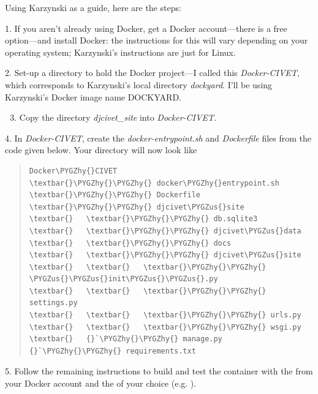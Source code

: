 \documentclass[letterpaper,10pt,english]{sphinxmanual}
\def\PYGZus{\char`\_}
\def\PYGZhy{\char`\-}
\begin{document}
Using Karzynski as a guide, here are the steps:

1. If you aren't already using Docker, get a Docker account—there is a free option—and install Docker: the instructions for
this will vary depending on your operating system; Karzynski's instructions are just for Linux.

2. Set-up a directory to hold the Docker project---I called this \emph{Docker-CIVET}, which corresponds to Karzynski's local
directory \emph{dockyard}. I'll be using Karzynski's Docker image name DOCKYARD.
\begin{enumerate}
\setcounter{enumi}{2}
\item {} 
Copy the directory \emph{djcivet\_site} into \emph{Docker-CIVET}.

\end{enumerate}

4. In \emph{Docker-CIVET}, create the \emph{docker-entrypoint.sh} and \emph{Dockerfile} files from the code given below. Your directory
will now look like
\begin{quote}

\begin{Verbatim}[commandchars=\\\{\}]
Docker\PYGZhy{}CIVET
\textbar{}\PYGZhy{}\PYGZhy{} docker\PYGZhy{}entrypoint.sh
\textbar{}\PYGZhy{}\PYGZhy{} Dockerfile
\textbar{}\PYGZhy{}\PYGZhy{} djcivet\PYGZus{}site
\textbar{}   \textbar{}\PYGZhy{}\PYGZhy{} db.sqlite3
\textbar{}   \textbar{}\PYGZhy{}\PYGZhy{} djcivet\PYGZus{}data
\textbar{}   \textbar{}\PYGZhy{}\PYGZhy{} docs
\textbar{}   \textbar{}\PYGZhy{}\PYGZhy{} djcivet\PYGZus{}site
\textbar{}   \textbar{}   \textbar{}\PYGZhy{}\PYGZhy{} \PYGZus{}\PYGZus{}init\PYGZus{}\PYGZus{}.py
\textbar{}   \textbar{}   \textbar{}\PYGZhy{}\PYGZhy{} settings.py
\textbar{}   \textbar{}   \textbar{}\PYGZhy{}\PYGZhy{} urls.py
\textbar{}   \textbar{}   \textbar{}\PYGZhy{}\PYGZhy{} wsgi.py
\textbar{}   {}`\PYGZhy{}\PYGZhy{} manage.py
{}`\PYGZhy{}\PYGZhy{} requirements.txt
\end{Verbatim}
\end{quote}

5. Follow the remaining instructions to build and test the container with the  from your Docker account and the
 of your choice (e.g. ).
\end{document}
